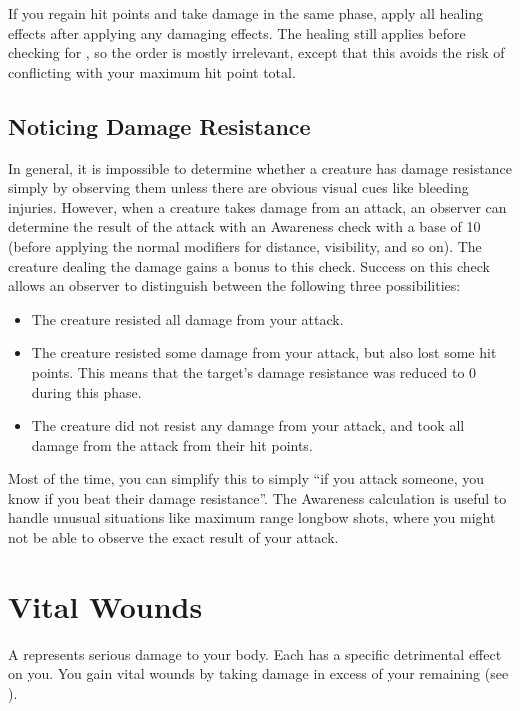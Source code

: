         \label{Simultaneous Damage and Healing}
        If you regain hit points and take damage in the same phase, apply all healing effects after applying any damaging effects.
        The healing still applies before checking for , so the order is mostly irrelevant, except that this avoids the risk of conflicting with your maximum hit point total.

    \subsection{Noticing Damage Resistance}
        In general, it is impossible to determine whether a creature has damage resistance simply by observing them unless there are obvious visual cues like bleeding injuries.
        However, when a creature takes damage from an attack, an observer can determine the result of the attack with an Awareness check with a base  of 10 (before applying the normal modifiers for distance, visibility, and so on).
        The creature dealing the damage gains a  bonus to this check.
        Success on this check allows an observer to distinguish between the following three possibilities:
        \begin{itemize}
            \item The creature resisted all damage from your attack.
            \item The creature resisted some damage from your attack, but also lost some hit points.
                This means that the target's damage resistance was reduced to 0 during this phase.
            \item The creature did not resist any damage from your attack, and took all damage from the attack from their hit points.
        \end{itemize}
        Most of the time, you can simplify this to simply ``if you attack someone, you know if you beat their damage resistance''.
        The Awareness calculation is useful to handle unusual situations like maximum range longbow shots, where you might not be able to observe the exact result of your attack.

\section{Vital Wounds}\label{Vital Wounds}
    A  represents serious damage to your body.
    Each  has a specific detrimental effect on you.
    You gain vital wounds by taking damage in excess of your remaining  (see ).

